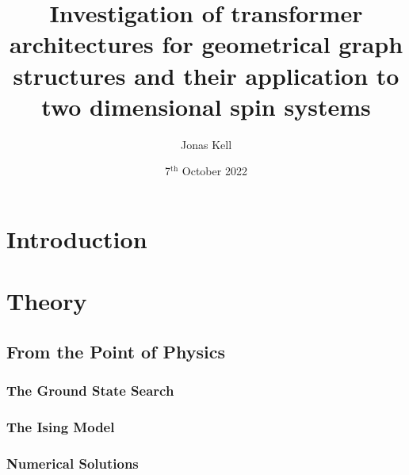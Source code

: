 \documentclass[
headings=optiontohead,              %
12pt,                               %
DIV=13,                             %
twoside=false,                      %
open=right,                         %
BCOR=10mm,                          %
toc=bibliographynumbered            %
]{scrreport}
\title{Investigation of transformer architectures for geometrical graph structures and their application to two dimensional spin systems}
\author{Jonas Kell}
\date{7$^\text{th}$ October 2022}
\begin{document}
\thispagestyle{empty}                           %
\cleardoublepage                                %
\pagestyle{scrheadings}                         %
\renewcommand{\contentsname}{Table of Contents} %
\tableofcontents                                %
\cleardoublepage                                %

\clearpairofpagestyles
\ihead{\leftmark}
\ohead{\Ifstr{\leftmark}{\rightmark}{}{\rightmark}}
\cfoot*{\pagemark}


\chapter{Introduction}

\chapter{Theory}
    
    \FloatBarrier
    \section{From the Point of Physics}
        \subsection{The Ground State Search}
        \subsection{The Ising Model}
        \subsection{Numerical Solutions}
\end{document}
